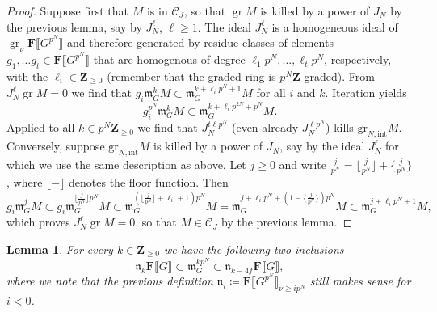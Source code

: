 \documentclass[11pt, oneside]{article}
\newcommand{\grint}{\text{gr}_{N,\text{int}}}
\DeclareMathOperator{\gr}{gr}
\newtheorem{lemma}{Lemma}
\theoremstyle{definition}
\begin{document}
	\begin{proof}
		Suppose first that $M$ is in $\mathcal C_J$, so that $\gr M$ is killed by a power of $J_N$ by the previous lemma, say by $J_N^\ell$, $\ell\geq1$. The ideal $J_N^\ell$ is a homogeneous ideal of $\gr_{\nu}\mathbf F\llbracket G^{p^N}\rrbracket$ and therefore generated by residue classes of elements $g_1,\dots g_t\in\mathbf F\llbracket G^{p^N}\rrbracket$ that are homogenous of degree $\ell_1p^N,\dots,\ell_tp^N$, respectively, with the $\ell_i\in\mathbf Z_{\geq0}$ (remember that the graded ring is $p^N\mathbf Z$-graded). From $J_N^\ell\gr M=0$ we find that $g_i\mathfrak m_G^kM\subset\mathfrak m_G^{k+\ell_ip^N+1}M$ for all $i$ and $k$. Iteration yields $$g_i^{p^N}\mathfrak m_G^kM\subset\mathfrak m_G^{k+\ell_ip^{2N}+p^N}M.$$
		Applied to all $k\in p^N\mathbf Z_{\geq0}$ we find that $J_N^{t\ell p^N}$ (even already $J_N^{\ell p^N}$) kills $\grint M$.\\
		Conversely, suppose $\grint M$ is killed by a power of $J_N$, say by the ideal $J_N^\ell$ for which we use the same description as above. Let $j\geq0$ and write $\frac j{p^N}=\lfloor\frac j{p^N}\rfloor+\{\frac j{p^N}\}$, where $\lfloor-\rfloor$ denotes the floor function. Then $$g_i\mathfrak m_G^jM\subset g_i\mathfrak m_G^{\lfloor\frac j{p^N}\rfloor p^N}M\subset\mathfrak m_G^{\left(\lfloor\frac j{p^N}\rfloor+\ell_i+1\right)p^N}M=\mathfrak m_G^{j+\ell_ip^N+\left(1-\{\frac j{p^N}\}\right)p^N}M\subset\mathfrak m_G^{j+\ell_ip^N+1}M,$$ which proves $J_N^\ell\gr M=0$, so that $M\in\mathcal C_J$ by the previous lemma.
	\end{proof}
	\begin{lemma}
		For every $k\in\mathbf Z_{\geq0}$ we have the following two inclusions $$\mathfrak n_k\mathbf F\llbracket G\rrbracket\subset\mathfrak m_G^{kp^N}\subset\mathfrak n_{k-4f}\mathbf F\llbracket G\rrbracket,$$
		where we note that the previous definition $\mathfrak n_i\coloneqq\mathbf F\llbracket G^{p^N}\rrbracket_{\nu\geq ip^N}$ still makes sense for $i<0$.
	\end{lemma}
\end{document}
